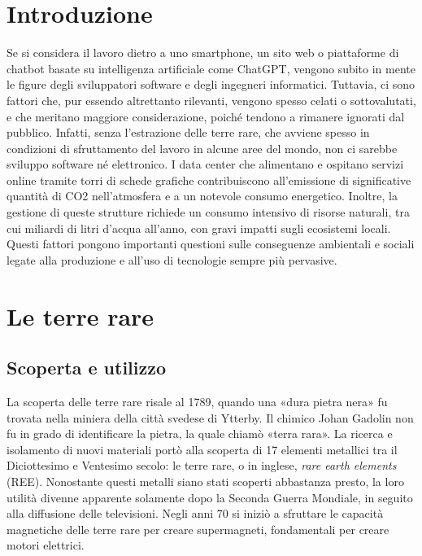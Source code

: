 \documentclass[12pt,a4paper,oneside]{book}
\begin{document}
\restoregeometry




\topmargin=-2cm
\setcounter{page}{1}
\textheight=23cm  %
\tableofcontents

\raggedbottom

\setcounter{chapter}{-1}
\chapter{Introduzione}

Se si considera il lavoro dietro a uno smartphone, un sito web o piattaforme di chatbot basate su intelligenza artificiale come ChatGPT, vengono subito in mente le figure degli sviluppatori software e degli ingegneri informatici. Tuttavia, ci sono fattori che, pur essendo altrettanto rilevanti, vengono spesso celati o sottovalutati, e che meritano maggiore considerazione, poiché tendono a rimanere ignorati dal pubblico. Infatti, senza l'estrazione delle terre rare, che avviene spesso in condizioni di sfruttamento del lavoro in alcune aree del mondo, non ci sarebbe sviluppo software né elettronico. I data center che alimentano e ospitano servizi online tramite torri di schede grafiche contribuiscono all'emissione di significative quantità di CO2 nell'atmosfera e a un notevole consumo energetico. Inoltre, la gestione di queste strutture richiede un consumo intensivo di risorse naturali, tra cui miliardi di litri d'acqua all'anno, con gravi impatti sugli ecosistemi locali. Questi fattori pongono importanti questioni sulle conseguenze ambientali e sociali legate alla produzione e all'uso di tecnologie sempre più pervasive.

\pagestyle{plain}

\chapter{Le terre rare}

\section{Scoperta e utilizzo}

La scoperta delle terre rare risale al 1789, quando una «dura pietra nera» fu trovata nella miniera della città svedese di Ytterby. Il chimico Johan Gadolin non fu in grado di identificare la pietra, la quale chiamò «terra rara». La ricerca e isolamento di nuovi materiali portò alla scoperta di 17 elementi metallici tra il Diciottesimo e Ventesimo secolo: le terre rare, o in inglese, \textit{rare earth elements} (REE).
Nonostante questi metalli siano stati scoperti abbastanza presto, la loro utilità divenne apparente solamente dopo la Seconda Guerra Mondiale, in seguito alla diffusione delle televisioni. Negli anni 70 si iniziò a sfruttare le capacità magnetiche delle terre rare per creare supermagneti, fondamentali per creare motori elettrici.
\end{document}
